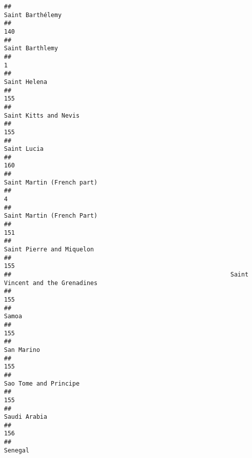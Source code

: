 \documentclass[]{article}
\begin{document}
\begin{verbatim}
##                                                                             Saint Barthélemy 
##                                                                                          140 
##                                                                             Saint Barthlemy 
##                                                                                            1 
##                                                                                 Saint Helena 
##                                                                                          155 
##                                                                        Saint Kitts and Nevis 
##                                                                                          155 
##                                                                                  Saint Lucia 
##                                                                                          160 
##                                                                   Saint Martin (French part) 
##                                                                                            4 
##                                                                   Saint Martin (French Part) 
##                                                                                          151 
##                                                                    Saint Pierre and Miquelon 
##                                                                                          155 
##                                                             Saint Vincent and the Grenadines 
##                                                                                          155 
##                                                                                        Samoa 
##                                                                                          155 
##                                                                                   San Marino 
##                                                                                          155 
##                                                                        Sao Tome and Principe 
##                                                                                          155 
##                                                                                 Saudi Arabia 
##                                                                                          156 
##                                                                                      Senegal 

\end{verbatim}
\end{document}

